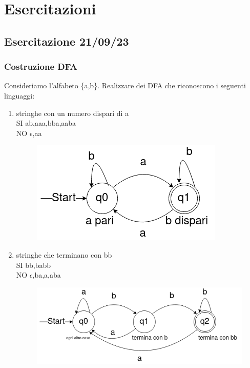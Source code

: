 \section{Esercitazioni} 
\subsection{Esercitazione 21/09/23}
\subsubsection{Costruzione DFA}
Consideriamo l'alfabeto \{a,b\}. 
Realizzare dei DFA che riconoscono i seguenti linguaggi:
\begin{enumerate}
  \item stringhe con un numero dispari di a 
\\ SI ab,aaa,bba,aaba
\\ NO $\epsilon$,aa

\begin{figure}[h]
  \includegraphics[scale = 0.5]{media/09_21_es1.png}
  \centering
\end{figure}

\item 
stringhe che terminano con bb
\\ SI bb,babb
\\ NO $\epsilon$,ba,a,aba

\begin{figure}[h]
  \includegraphics[scale = 0.5]{media/09_21_es2.png}
  \centering
\end{figure}


\end{enumerate}
